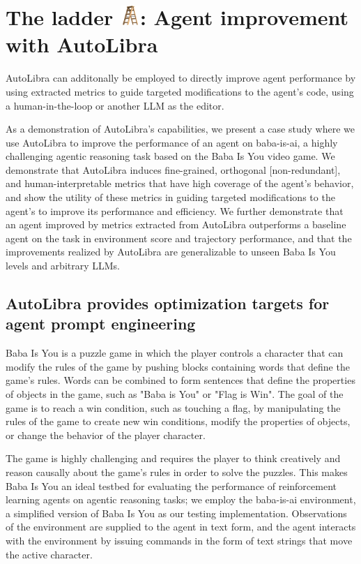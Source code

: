 \section{The ladder \protect\includegraphics[height=1em]{figs/ladder.png}: Agent improvement with AutoLibra}

AutoLibra can additonally be employed to directly improve agent performance by using extracted metrics to guide targeted modifications to the agent's code, using a human-in-the-loop or another LLM as the editor.

As a demonstration of AutoLibra's capabilities, we present a case study where we use AutoLibra to improve the performance of an agent on baba-is-ai, a highly challenging agentic reasoning task based on the Baba Is You video game. We demonstrate that AutoLibra induces fine-grained, orthogonal [non-redundant], and human-interpretable metrics that have high coverage of the agent's behavior, and show the utility of these metrics in guiding targeted modifications to the agent's to improve its performance and efficiency. We further demonstrate that an agent improved by metrics extracted from AutoLibra outperforms a baseline agent on the task in environment score and trajectory performance, and that the improvements realized by AutoLibra are generalizable to unseen Baba Is You levels and arbitrary LLMs.

\subsection{AutoLibra provides optimization targets for agent prompt engineering}
\label{sec:baba-is-ai}
Baba Is You is a puzzle game in which the player controls a character that can modify the rules of the game by pushing blocks containing words that define the game's rules. Words can be combined to form sentences that define the properties of objects in the game, such as "Baba is You" or "Flag is Win". The goal of the game is to reach a win condition, such as touching a flag, by manipulating the rules of the game to create new win conditions, modify the properties of objects, or change the behavior of the player character.

The game is highly challenging and requires the player to think creatively and reason causally about the game's rules in order to solve the puzzles. This makes Baba Is You an ideal testbed for evaluating the performance of reinforcement learning agents on agentic reasoning tasks; we employ the baba-is-ai environment, a simplified version of Baba Is You \cite{cloos2024babaaibreakrules, paglieri2024balrog} as our testing implementation. Observations of the environment are supplied to the agent in text form, and the agent interacts with the environment by issuing commands in the form of text strings that move the active character.

